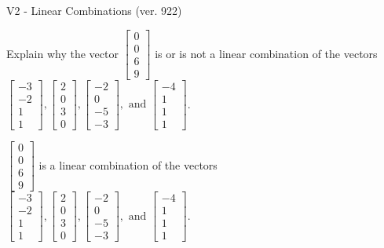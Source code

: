 \begin{exercise}
  \begin{exerciseTitle}V2 - Linear Combinations (ver. 922)\end{exerciseTitle}
  \begin{exerciseStatement}
    Explain why the vector \(\left[\begin{array}{c}
0 \\
0 \\
6 \\
9
\end{array}\right]\)  is or is not a linear 
	combination of the vectors \(\left[\begin{array}{c}
-3 \\
-2 \\
1 \\
1
\end{array}\right] , \left[\begin{array}{c}
2 \\
0 \\
3 \\
0
\end{array}\right] , \left[\begin{array}{c}
-2 \\
0 \\
-5 \\
-3
\end{array}\right] , \text{ and } \left[\begin{array}{c}
-4 \\
1 \\
1 \\
1
\end{array}\right]\).
	


  \end{exerciseStatement}
  \begin{exerciseAnswer}
   \(\left[\begin{array}{c}
0 \\
0 \\
6 \\
9
\end{array}\right]\) 
  	 is  
	a linear combination of the vectors \(\left[\begin{array}{c}
-3 \\
-2 \\
1 \\
1
\end{array}\right] , \left[\begin{array}{c}
2 \\
0 \\
3 \\
0
\end{array}\right] , \left[\begin{array}{c}
-2 \\
0 \\
-5 \\
-3
\end{array}\right] , \text{ and } \left[\begin{array}{c}
-4 \\
1 \\
1 \\
1
\end{array}\right]\).


\end{exerciseAnswer}
\end{exercise}
